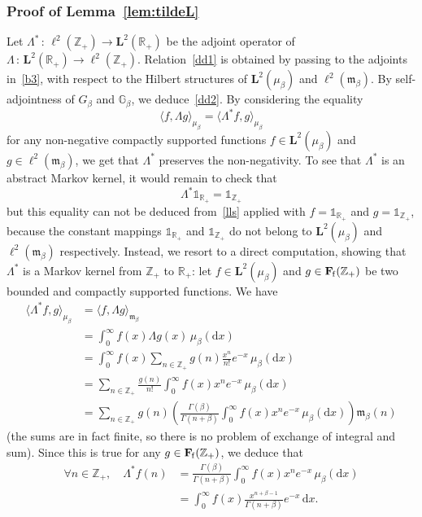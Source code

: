 \documentclass[AHL,Unicode,longabstracts]{cedram}
\newcommand{\RR}{\mathbb{R}}
\newcommand{\ZZ}{\mathbb{Z}}
\newcommand{\fm}{\mathfrak{m}}
\newcommand{\iy}{\infty}
\newcommand{\lt}{\left}
\newcommand{\ri}{\rightarrow}
\newcommand{\rt}{\right}
\newcommand{\st}{\,:\,}
\newcommand{\un}{\mathds{1}}
\newcommand{\dBg}{{\discret{G}}}
\newcommand{\Bg}{G}
\newcommand{\esL}{\mathbf{L}}
\newcommand{\esLd}{\ell}
\newcommand{\esF}{\mathbf{F}}
\newcommand{\esFf}{\esF_{\hskip-.3mm\mathrm{f}}}
\newcommand{\discret}[1]{\mathds{#1}}
\newcommand{\adjL}{\Lambda^*}
\let\oldforall\forall
\renewcommand*{\forall}{\mathrel{\oldforall}}
\newcommand*{\dd}{\mathrm{d}}
\newcommand*{\dx}{\dd x}
\begin{document}
\subsubsection{Proof of Lemma~\ref{lem:tildeL}} Let $\adjL\st \esLd^2(\ZZ_+)\ri\esL^2(\RR_+)$ be the adjoint operator of $\Lambda\st \esL^2(\RR_+)\ri\esLd^2(\ZZ_+)$. Relation~\eqref{dd1} is obtained by passing to the adjoints in~\eqref{b3}, with respect to the Hilbert structures of $\esL^2(\mu_{\beta})$ and $\esLd^2(\fm_{\beta})$. By self-adjointness of $\Bg_{\beta}$ and $\dBg_{\beta}$, we deduce~\eqref{dd2}. By considering the equality
\begin{equation}\label{lls}
\langle f,\Lambda g\rangle_{\mu_{\beta}}=\langle \adjL f, g\rangle_{\mu_{\beta}}
\end{equation}
for any non-negative compactly supported functions $f\in\esL^2(\mu_{\beta})$ and $g\in\esLd^2(\fm_{\beta})$, we get that $\adjL$ preserves the non-negativity. To see that $\adjL$ is an abstract Markov kernel, it would remain to check that
\[
\adjL \un_{\RR_+}=\un_{\ZZ_+}
\]
but this equality can not be deduced from~\eqref{lls} applied with $f=\un_{\RR_+}$ and $g=\un_{\ZZ_+}$, because the constant mappings $\un_{\RR_+}$ and $\un_{\ZZ_+}$ do not belong to $\esL^2(\mu_{\beta})$ and $\esLd^2(\fm_{\beta})$ respectively. Instead, we resort to a direct computation, showing that $\adjL $ is a Markov kernel from $\ZZ_+$ to $\RR_+$: let $f\in\esL^2(\mu_{\beta})$ and $g\in \esFf(\ZZ_+)$ be two bounded and compactly supported functions. We have
\begin{align*}
\langle \adjL f, g\rangle_{\mu_{\beta}}&=\langle f,\Lambda g\rangle_{\fm_{\beta}}\phantom{\int_0}\\
&=\int_0^{\iy } f(x)\Lambda g(x)\, \mu_{\beta}(\dx)\\
&=\int_0^{\iy } f(x)\sum_{n\in\ZZ_+}g(n)\frac{x^n}{n!}e^{-x}\, \mu_{\beta}(\dx)\\
&=\sum_{n\in\ZZ_+}\frac{g(n)}{n!}\int_0^{\iy } f(x)x^ne^{-x}\, \mu_{\beta}(\dx)\\
&=\sum_{n\in\ZZ_+}g(n)\lt(\frac{\Gamma(\beta)}{\Gamma(n+\beta)}\int_0^{\iy } f(x)x^ne^{-x}\, \mu_{\beta}(\dx)\rt)\fm_{\beta}(n)
\end{align*}
(the sums are in fact finite, so there is no problem of exchange of integral and sum). Since this is true for any $g\in \esFf(\ZZ_+)$, we deduce that
\begin{align*}
\forall n\in\ZZ_+,\quad
\adjL f(n)&=\frac{\Gamma(\beta)}{\Gamma(n+\beta)}\int_0^{\iy } f(x)x^ne^{-x}\, \mu_{\beta}(\dx)\\
&=\int_0^{\iy } f(x)\frac{x^{n+\beta-1}}{\Gamma(n+\beta)}e^{-x}\,\dx.
\end{align*}
\end{document}

